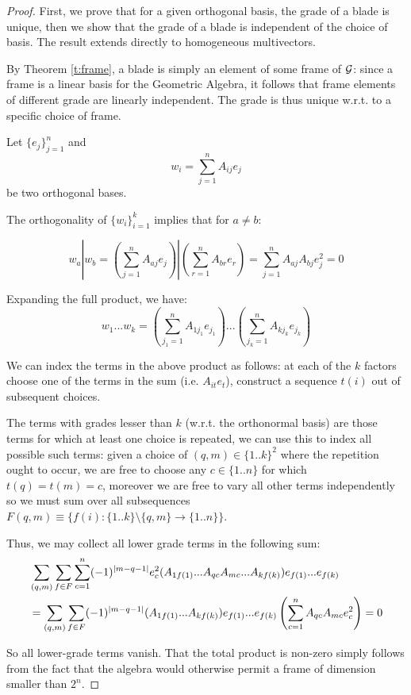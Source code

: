 \begin{proof}
	First, we prove that for a given orthogonal basis, the grade of a blade is unique, then we show that the grade of a blade is independent of the choice of basis. The result extends directly to homogeneous multivectors.

	By Theorem \ref{t:frame}, a blade is simply an element of some frame of $\mathcal{G}$: since a frame is a linear basis for the Geometric Algebra, it follows that frame elements of different grade are linearly independent. The grade is thus unique w.r.t. to a specific choice of frame.


	Let $\{e_j\}_{j=1}^n$ and \[w_i = \sum_{j=1}^n A_{ij} e_j\] be two orthogonal bases.
	

	The orthogonality of $\{w_i\}_{i=1}^k$ implies that for $a \neq b$:
		
	\[w_a|w_b = (\sum_{j=1}^n A_{aj} e_j)|(\sum_{r=1}^n A_{br} e_r) = \sum_{j=1}^n A_{aj}A_{bj}e_j^2 = 0\]

	Expanding the full product, we have:
	\[w_1...w_k = (\sum_{j_1=1}^n A_{1{j_1}}e_{j_1})...(\sum_{j_k=1}^n A_{k{j_k}}e_{j_k})\]

	We can index the terms in the above product as follows: at each of the $k$ factors choose one of the terms in the sum (i.e. $A_{it} e_t$), construct a sequence $t(i)$ out of subsequent choices.

	The terms with grades lesser than $k$ (w.r.t. the orthonormal basis) are those terms for which at least one choice is repeated, we can use this to index all possible such terms: given a choice of $(q, m) \in \{1..k\}^2$ where the repetition ought to occur, we are free to choose any $c \in \{1..n\}$ for which $t(q) = t(m) = c$, moreover we are free to vary all other terms independently so we must sum over all subsequences $F(q,m) \equiv \{f(i): \{1..k\}\setminus\{q,m\} \to \{1..n\}\}$. 

	Thus, we may collect all lower grade terms in the following sum:
	\begin{align*}
		&\sum_{(q,m)} \sum_{f \in F} \sum_{c=1}^n (-1)^{\left|m-q-1\right|}e_c^2(A_{1f(1)}...A_{qc}A_{mc}...A_{kf(k)})e_{f(1)}...e_{f(k)} \\
	&= \sum_{(q,m)} \sum_{f \in F} (-1)^{\left|m-q-1\right|}(A_{1f(1)}...A_{kf(k)})e_{f(1)}...e_{f(k)} \left(\sum_{c=1}^n A_{qc}A_{mc}e_c^2 \right) = 0
	\end{align*}
	
	So all lower-grade terms vanish. That the total product is non-zero simply follows from the fact that the algebra would otherwise permit a frame of dimension smaller than $2^n$.
\end{proof}
